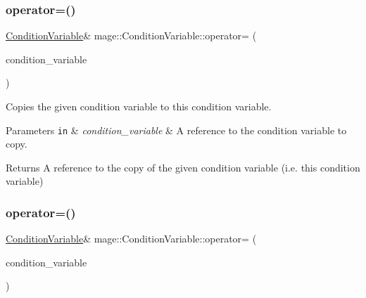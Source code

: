 \subsubsection{\texorpdfstring{operator=()}{operator=()}\hspace{0.1cm}{\footnotesize\ttfamily [1/2]}}
{\footnotesize\ttfamily \hyperlink{structmage_1_1_condition_variable}{Condition\+Variable}\& mage\+::\+Condition\+Variable\+::operator= (\begin{DoxyParamCaption}\item[{const \hyperlink{structmage_1_1_condition_variable}{Condition\+Variable} \&}]{condition\+\_\+variable }\end{DoxyParamCaption})\hspace{0.3cm}{\ttfamily [delete]}}

Copies the given condition variable to this condition variable.


\begin{DoxyParams}[1]{Parameters}
\mbox{\tt in}  & {\em condition\+\_\+variable} & A reference to the condition variable to copy. \\
\hline
\end{DoxyParams}
\begin{DoxyReturn}{Returns}
A reference to the copy of the given condition variable (i.\+e. this condition variable) 
\end{DoxyReturn}
\hypertarget{structmage_1_1_condition_variable_a3f05c5b53b2530e9fdd1bb890aa375c4}{}\label{structmage_1_1_condition_variable_a3f05c5b53b2530e9fdd1bb890aa375c4} 
\subsubsection{\texorpdfstring{operator=()}{operator=()}\hspace{0.1cm}{\footnotesize\ttfamily [2/2]}}
{\footnotesize\ttfamily \hyperlink{structmage_1_1_condition_variable}{Condition\+Variable}\& mage\+::\+Condition\+Variable\+::operator= (\begin{DoxyParamCaption}\item[{\hyperlink{structmage_1_1_condition_variable}{Condition\+Variable} \&\&}]{condition\+\_\+variable }\end{DoxyParamCaption})\hspace{0.3cm}{\ttfamily [delete]}}

